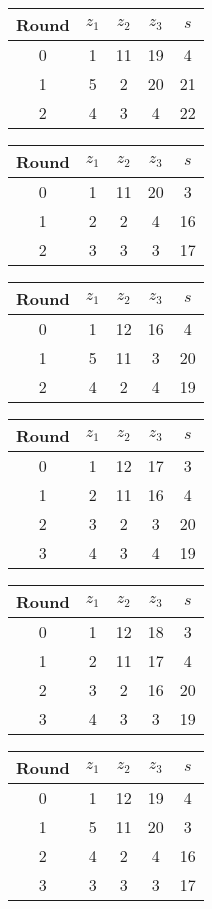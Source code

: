 \begin{multicols}{2}
\begin{tabular}{c | c | c | c | c }
Round & $z_1$ & $z_2$ & $z_3$ & $s$ \\
\hline
0 & 1 & 11 & 19 & 4 \\
1 & 5 & 2 & 20 & 21 \\
2 & 4 & 3 & 4 & 22
\end{tabular}


\begin{tabular}{c | c | c | c | c }
Round & $z_1$ & $z_2$ & $z_3$ & $s$ \\
\hline
0 & 1 & 11 & 20 & 3 \\
1 & 2 & 2 & 4 & 16 \\
2 & 3 & 3 & 3 & 17
\end{tabular}


\begin{tabular}{c | c | c | c | c }
Round & $z_1$ & $z_2$ & $z_3$ & $s$ \\
\hline
0 & 1 & 12 & 16 & 4 \\
1 & 5 & 11 & 3 & 20 \\
2 & 4 & 2 & 4 & 19
\end{tabular}


\begin{tabular}{c | c | c | c | c }
Round & $z_1$ & $z_2$ & $z_3$ & $s$ \\
\hline
0 & 1 & 12 & 17 & 3 \\
1 & 2 & 11 & 16 & 4 \\
2 & 3 & 2 & 3 & 20 \\
3 & 4 & 3 & 4 & 19
\end{tabular}


\begin{tabular}{c | c | c | c | c }
Round & $z_1$ & $z_2$ & $z_3$ & $s$ \\
\hline
0 & 1 & 12 & 18 & 3 \\
1 & 2 & 11 & 17 & 4 \\
2 & 3 & 2 & 16 & 20 \\
3 & 4 & 3 & 3 & 19
\end{tabular}


\begin{tabular}{c | c | c | c | c }
Round & $z_1$ & $z_2$ & $z_3$ & $s$ \\
\hline
0 & 1 & 12 & 19 & 4 \\
1 & 5 & 11 & 20 & 3 \\
2 & 4 & 2 & 4 & 16 \\
3 & 3 & 3 & 3 & 17
\end{tabular}



\end{multicols}
